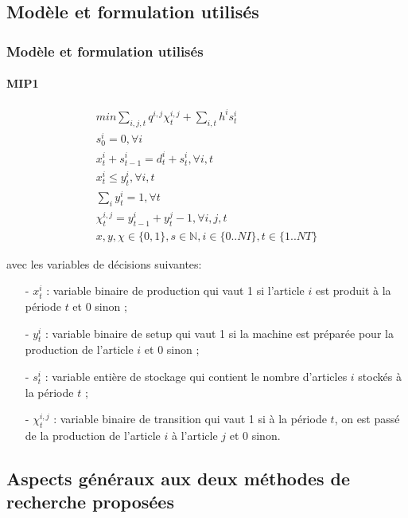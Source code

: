 \documentclass[11pt]{beamer}
\begin{document}
 \subsection{Modèle et formulation utilisés}
 \begin{frame}[allowframebreaks]
 \frametitle{Modèle et formulation utilisés}
 \framesubtitle{MIP1}
 	\begin{eqnarray}
		min \sum_{i,j,t} q^{i,j}\chi_{t}^{i,j} + \sum_{i,t} h^{i} s_{t}^{i} \\
		s_{0}^{i} = 0, \forall i \\
		x_{t}^{i} + s_{t-1}^{i} = d_{t}^{i} + s_{t}^{i}, \forall i,t \\
		x_{t}^{i} \leq y_{t}^{i}, \forall i,t \\
		\sum_{i} y_{t}^{i} = 1 , \forall t \\
		\chi_{t}^{i,j} = y_{t-1}^{i} + y_{t}^{j} - 1, \forall i,j,t \\
		x,y,\chi \in \{0,1\}, s \in \mathbb{N}, i \in \{0..NI\}, t \in \{1..NT\}
	\end{eqnarray}
		
		avec les variables de décisions suivantes: \\
		\begin{itemize}
			\item[-] $x_{t}^{i}$ : variable binaire de production qui vaut 1 si l’article $i$ est produit à la période $t$ et 0 sinon ;
			\item[-] $y_{t}^{i}$ : variable binaire de setup qui vaut 1 si la machine est préparée pour la production de l’article $i$ et 0 sinon ;
			\item[-] $s_{t}^{i}$ : variable entière de stockage qui contient le nombre d’articles $i$ stockés à la période $t$ ; 
			\item[-] $\chi_{t}^{i,j}$ : variable binaire de transition qui vaut 1 si à la période $t$, on est passé de la production de l’article $i$ à l’article $j$ et 0 sinon.
		\end{itemize}
 \end{frame}
 
 \subsection{Aspects généraux aux deux méthodes de recherche proposées}
 
\end{document}

